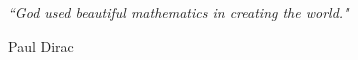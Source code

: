 

\pagestyle{empty} %

\null\vfill %

\textit{``God used beautiful mathematics in creating the world."}

\begin{flushright}
Paul Dirac
\end{flushright}

\vfill\vfill\vfill\vfill\vfill\vfill\null %

\clearpage %
